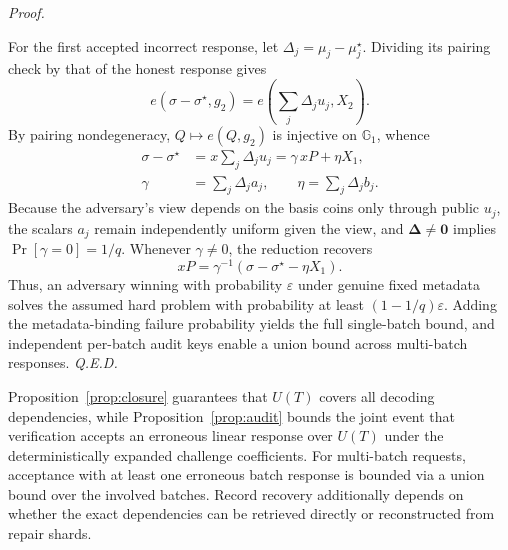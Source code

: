 \documentclass[10pt,journal]{IEEEtran}
\newenvironment{claimproof}{\par\noindent\emph{Proof. }\ignorespaces
}{\hfill\textit{Q.E.D.}\par\smallskip}
\begin{document}
\begin{claimproof}
For the first accepted incorrect response, let $\Delta_j=\mu_j-\mu_j^\star$. Dividing its pairing check by that of the honest response gives
\begin{equation}
e(\sigma-\sigma^\star,g_2)
=e\left(\sum_j\Delta_j u_j,X_2\right).
\end{equation}
By pairing nondegeneracy, $Q\mapsto e(Q,g_2)$ is injective on $\mathbb G_1$, whence
\begin{equation}
\begin{aligned}
\sigma-\sigma^\star&=x\sum_j\Delta_j u_j=\gamma\,xP+\eta X_1,\\
\gamma&=\sum_j\Delta_j a_j,\qquad \eta=\sum_j\Delta_j b_j.
\end{aligned}
\end{equation}
Because the adversary's view depends on the basis coins only through public $u_j$, the scalars $a_j$ remain independently uniform given the view, and $\boldsymbol\Delta\ne\mathbf 0$ implies $\Pr[\gamma=0]=1/q$. Whenever $\gamma\ne0$, the reduction recovers
\begin{equation}
xP=\gamma^{-1}(\sigma-\sigma^\star-\eta X_1).
\end{equation}
Thus, an adversary winning with probability $\varepsilon$ under genuine fixed metadata solves the assumed hard problem with probability at least $(1-1/q)\varepsilon$. Adding the metadata-binding failure probability yields the full single-batch bound, and independent per-batch audit keys enable a union bound across multi-batch responses.
\end{claimproof}
Proposition~\ref{prop:closure} guarantees that $U(T)$ covers all decoding dependencies, while Proposition~\ref{prop:audit} bounds the joint event that verification accepts an erroneous linear response over $U(T)$ under the deterministically expanded challenge coefficients. For multi-batch requests, acceptance with at least one erroneous batch response is bounded via a union bound over the involved batches. Record recovery additionally depends on whether the exact dependencies can be retrieved directly or reconstructed from repair shards.
\end{document}
